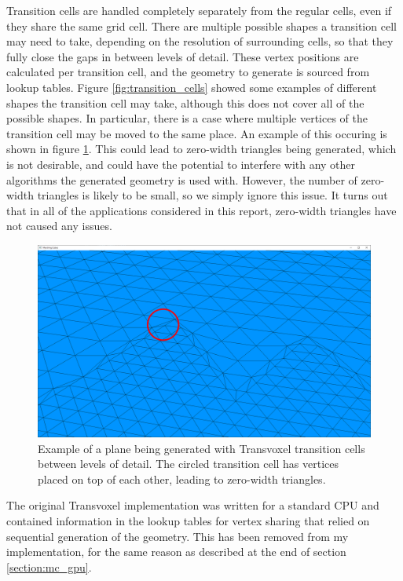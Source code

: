 \documentclass{article}
\begin{document}
\begin{enumerate}
Transition cells are handled completely separately from the regular cells, even if they share the same grid cell. There are multiple possible shapes a transition cell may need to take, depending on the resolution of surrounding cells, so that they fully close the gaps in between levels of detail. These vertex positions are calculated per transition cell, and the geometry to generate is sourced from lookup tables. Figure \ref{fig:transition_cells} showed some examples of different shapes the transition cell may take, although this does not cover all of the possible shapes. In particular, there is a case where multiple vertices of the transition cell may be moved to the same place. An example of this occuring is shown in figure \ref{fig:tv_transition_plane}. This could lead to zero-width triangles being generated, which is not desirable, and could have the potential to interfere with any other algorithms the generated geometry is used with. However, the number of zero-width triangles is likely to be small, so we simply ignore this issue. It turns out that in all of the applications considered in this report, zero-width triangles have not caused any issues.

\begin{figure}[H]
  \includegraphics[width=\textwidth]{tv_transition_plane}
  \caption{Example of a plane being generated with Transvoxel transition cells between levels of detail. The circled transition cell has vertices placed on top of each other, leading to zero-width triangles.}
  \label{fig:tv_transition_plane}
\end{figure}

\end{enumerate}

The original Transvoxel implementation was written for a standard CPU and contained information in the lookup tables for vertex sharing that relied on sequential generation of the geometry. This has been removed from my implementation, for the same reason as described at the end of section \ref{section:mc_gpu}.
\end{document}
